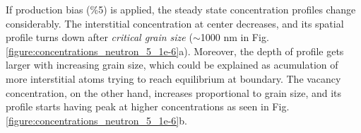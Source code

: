 \documentclass[a4paper]{article}
\begin{document}
    \newpage
     If production bias (\%5) is applied, the steady state concentration profiles change considerably. The interstitial concentration at center decreases, and its spatial profile turns down after \textit{critical grain size} (${\sim}$1000 nm in Fig. \ref{figure:concentrations_neutron_5_1e-6}a). Moreover, the depth of profile gets larger with increasing grain size, which could be explained as acumulation of more interstitial atoms trying to reach equilibrium at boundary. The vacancy concentration, on the other hand, increases proportional to grain size, and its profile starts having peak at higher concentrations as seen in Fig. \ref{figure:concentrations_neutron_5_1e-6}b.\\
    \begin{figure}[h!]  %
      \centering
      \qquad

\end{figure}
\end{document}

